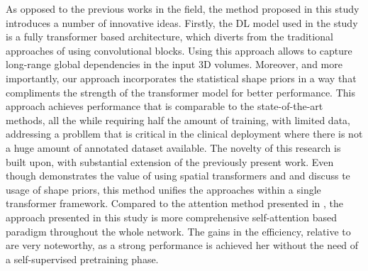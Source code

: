 As opposed to the previous works in the field, the method proposed in this study introduces a number of innovative ideas. Firstly, the DL model used in the study is a fully transformer based architecture, which diverts from the traditional approaches of using convolutional blocks. Using this approach allows to capture long-range global dependencies in the input 3D volumes. Moreover, and more importantly, our approach incorporates the statistical shape priors in a way that compliments the strength of the transformer model for better performance. This approach achieves performance that is comparable to the state-of-the-art methods, all the while requiring half the amount of training, with limited data, addressing a probllem that is critical in the clinical deployment where there is not a huge amount of annotated dataset available. The novelty of this research is built upon, with substantial extension of the previously present work. Even though \cite{10488032} demonstrates the value of using spatial transformers and and \cite{ZHU2023106954} discuss te usage of shape priors, this method unifies the approaches within a single transformer framework. Compared to the attention method presented in \cite{ZHANG2023107267}, the approach presented in this study is more comprehensive self-attention based paradigm throughout the whole network. The gains in the efficiency, relative to \cite{10.1145/3632047.3632078} are very noteworthy, as a strong performance is achieved her without the need of a self-supervised pretraining phase.
